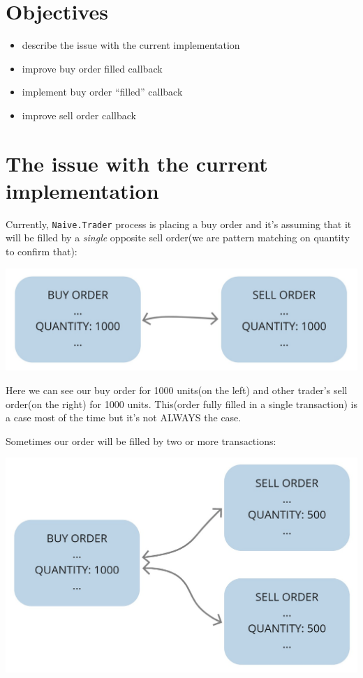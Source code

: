 \documentclass[
  oneside]{book}
\providecommand{\tightlist}{%
  \setlength{\itemsep}{0pt}\setlength{\parskip}{0pt}}
\begin{document}
\section{Objectives}\label{objectives-7}

\begin{itemize}
\tightlist
\item
  describe the issue with the current implementation
\item
  improve buy order filled callback
\item
  implement buy order ``filled'' callback
\item
  improve sell order callback
\end{itemize}

\section{The issue with the current implementation}\label{the-issue-with-the-current-implementation}

Currently, \texttt{Naive.Trader} process is placing a buy order and it's assuming that it will be filled by a \emph{single} opposite sell order(we are pattern matching on quantity to confirm that):

\begin{center}\includegraphics[width=0.8\linewidth]{images/chapter_08_01_single_transaction} \end{center}

Here we can see our buy order for 1000 units(on the left) and other trader's sell order(on the right) for 1000 units. This(order fully filled in a single transaction) is a case most of the time but it's not ALWAYS the case.

\newpage

Sometimes our order will be filled by two or more transactions:

\begin{center}\includegraphics[width=0.8\linewidth]{images/chapter_08_02_multiple_transactions_per_order} \end{center}
\end{document}
